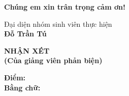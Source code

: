 \vspace{0.3cm}

\begin{center}
    \textbf{Chúng em xin trân trọng cảm ơn!}
\end{center}

\vspace{1cm}

\begin{flushright}
    \begin{minipage}{0.48\textwidth}
        \centering
        Đại diện nhóm sinh viên thực hiện\\[1.5cm]
        \textbf{Đỗ Trần Tú}
    \end{minipage}
\end{flushright}



\clearpage
\thispagestyle{empty}

\begin{center}
    \textbf{\Large NHẬN XÉT}\\[0.3cm]
    \textbf{(Của giảng viên phản biện)}
\end{center}

\vspace{0.8cm}

\noindent
\dotfill

\vspace{0.5cm}
\noindent \dotfill

\vspace{0.5cm}
\noindent \dotfill

\vspace{0.5cm}
\noindent \dotfill

\vspace{0.5cm}
\noindent \dotfill

\vspace{0.5cm}
\noindent \dotfill

\vspace{0.5cm}
\noindent \dotfill

\vspace{0.5cm}
\noindent \dotfill

\vspace{0.8cm}

\noindent
\textbf{Điểm:} \dotfill\\[0.5cm]

\noindent
\textbf{Bằng chữ:} \dotfill

\vspace{0.8cm}

